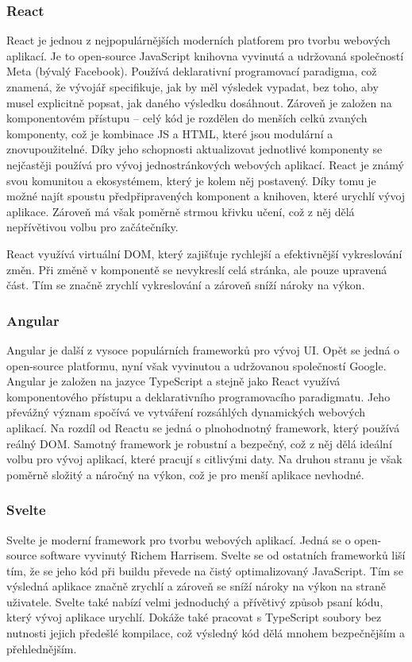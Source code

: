 \subsubsection*{React}
React je jednou z nejpopulárnějších moderních platforem pro tvorbu webových aplikací. Je to open-source JavaScript knihovna vyvinutá a udržovaná společností Meta (bývalý Facebook). Používá deklarativní programovací paradigma, což znamená, že vývojář specifikuje, jak by měl výsledek vypadat, bez toho, aby musel explicitně popsat, jak daného výsledku dosáhnout. Zároveň je založen na komponentovém přístupu -- celý kód je rozdělen do menších celků zvaných komponenty, což je kombinace JS a HTML, které jsou modulární a znovupoužitelné. Díky jeho schopnosti aktualizovat jednotlivé komponenty se nejčastěji používá pro vývoj jednostránkových webových aplikací. React je známý svou komunitou a ekosystémem, který je kolem něj postavený. Díky tomu je možné najít spoustu předpřipravených komponent a knihoven, které urychlí vývoj aplikace. Zároveň má však poměrně strmou křivku učení, což z něj dělá nepřívětivou volbu pro začátečníky.

React využívá virtuální DOM, který zajišťuje rychlejší a efektivnější vykreslování změn. Při změně v komponentě se nevykreslí celá stránka, ale pouze upravená část. Tím se značně zrychlí vykreslování a zároveň sníží nároky na výkon.\cite{react, what_react_is_and_why_it_matters,angular_vs_react}

\subsubsection*{Angular}
Angular je další z vysoce populárních frameworků pro vývoj UI. Opět se jedná o open-source platformu, nyní však vyvinutou a udržovanou společností Google. Angular je založen na jazyce TypeScript a stejně jako React využívá komponentového přístupu a deklarativního programovacího paradigmatu. Jeho převážný význam spočívá ve vytváření rozsáhlých dynamických webových aplikací. Na rozdíl od Reactu se jedná o plnohodnotný framework, který používá reálný DOM. Samotný framework je robustní a bezpečný, což z něj dělá ideální volbu pro vývoj aplikací, které pracují s citlivými daty. Na druhou stranu je však poměrně složitý a náročný na výkon, což je pro menší aplikace nevhodné.\cite{what_is_angular,angular_vs_react}

\subsubsection*{Svelte}
Svelte je moderní framework pro tvorbu webových aplikací. Jedná se o open-source software vyvinutý Richem Harrisem. Svelte se od ostatních frameworků liší tím, že se jeho kód při buildu převede na čistý optimalizovaný JavaScript. Tím se výsledná aplikace značně zrychlí a zároveň se sníží nároky na výkon na straně uživatele. Svelte také nabízí velmi jednoduchý a přívětivý způsob psaní kódu, který vývoj aplikace urychlí. Dokáže také pracovat s TypeScript soubory bez nutnosti jejich předešlé kompilace, což výsledný kód dělá mnohem bezpečnějším a přehlednějším.\cite{svelte_and_why_you_should_consider_it,svelte}

